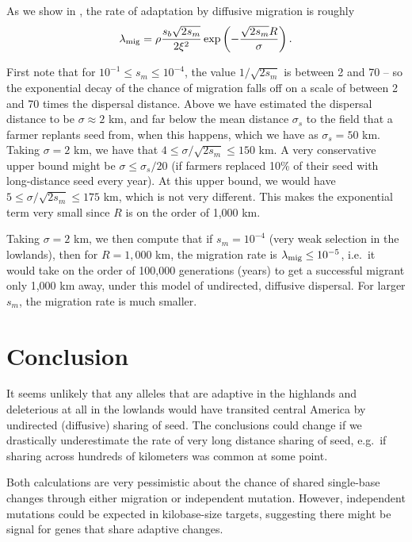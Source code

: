 As we show in  , 
the rate of adaptation by diffusive migration is roughly
\begin{align*}
  \lambda_{\text{mig}} = \rho \frac{s_b \sqrt{2 s_m}}{2\xi^2} \exp\left(- \frac{\sqrt{2 s_m}R}{\sigma} \right) .
\end{align*}


First note that for $10^{-1} \le s_m \le 10^{-4}$, the value $1/\sqrt{2s_m}$ is between 2 and 70 --
so the exponential decay of the chance of migration falls off on a scale of between 2 and 70 times the dispersal distance.
Above we have estimated the dispersal distance to be $\sigma \approx 2$ km,
and far below the mean distance $\sigma_s$ to the field that a farmer replants seed from, when this happens,
which we have as $\sigma_s = 50$ km.
Taking $\sigma=2$ km, we have that $4 \le \sigma/\sqrt{2s_m} \le 150$ km.
A very conservative upper bound might be $\sigma \le \sigma_s/20$ (if farmers replaced 10\% of their seed with long-distance seed every year).
At this upper bound, we would have $5 \le \sigma/\sqrt{2s_m} \le 175$ km,
which is not very different.
This makes the exponential term very small since $R$ is on the order of 1,000 km.

Taking $\sigma=2$ km, we then compute that 
if $s_m = 10^{-4}$ (very weak selection in the lowlands), then for $R=1,000$ km, the migration rate is $\lambda_{\text{mig}} \le 10^{-5}$,
i.e.\ it would take on the order of 100,000 generations (years) to get a successful migrant only 1,000 km away,
under this model of undirected, diffusive dispersal.
For larger $s_m$, the migration rate is much smaller.

\section{Conclusion}

It seems unlikely that any alleles that are adaptive in the highlands and deleterious at all in the lowlands
would have transited central America by undirected (diffusive) sharing of seed.
The conclusions could change if we drastically underestimate the rate of very long distance sharing of seed,
e.g.\ if sharing across hundreds of kilometers was common at some point.

Both calculations are very pessimistic about the chance of shared single-base changes through either migration or independent mutation.
However, independent mutations could be expected in kilobase-size targets,
suggesting there might be signal for genes that share adaptive changes.



